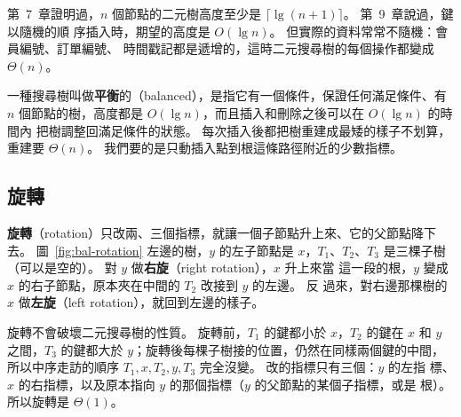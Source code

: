 第~7~章證明過，$n$ 個節點的二元樹高度至少是 $\lceil \lg(n+1) \rceil$。 第~9~章說過，鍵以隨機的順
序插入時，期望的高度是 $O(\lg n)$。 但實際的資料常常不隨機：會員編號、訂單編號、
時間戳記都是遞增的，這時二元搜尋樹的每個操作都變成 $\Theta(n)$。

一種搜尋樹叫做\textbf{平衡}的（balanced），是指它有一個條件，保證任何滿足條件、有
$n$ 個節點的樹，高度都是 $O(\lg n)$，而且插入和刪除之後可以在 $O(\lg n)$ 的時間內
把樹調整回滿足條件的狀態。 每次插入後都把樹重建成最矮的樣子不划算，重建要
$\Theta(n)$。 我們要的是只動插入點到根這條路徑附近的少數指標。

\subsection{旋轉}

\textbf{旋轉}（rotation）只改兩、三個指標，就讓一個子節點升上來、它的父節點降下
去。 圖~\ref{fig:bal-rotation} 左邊的樹，$y$ 的左子節點是 $x$，$T_1$、$T_2$、$T_3$
是三棵子樹（可以是空的）。 對 $y$ 做\textbf{右旋}（right rotation），$x$ 升上來當
這一段的根，$y$ 變成 $x$ 的右子節點，原本夾在中間的 $T_2$ 改接到 $y$ 的左邊。 反
過來，對右邊那棵樹的 $x$ 做\textbf{左旋}（left rotation），就回到左邊的樣子。

\begin{center}
\label{fig:bal-rotation}
\end{center}

旋轉不會破壞二元搜尋樹的性質。 旋轉前，$T_1$ 的鍵都小於 $x$，$T_2$ 的鍵在 $x$ 和
$y$ 之間，$T_3$ 的鍵都大於 $y$；旋轉後每棵子樹接的位置，仍然在同樣兩個鍵的中間，
所以中序走訪的順序 $T_1, x, T_2, y, T_3$ 完全沒變。 改的指標只有三個：$y$ 的左指
標、$x$ 的右指標，以及原本指向 $y$ 的那個指標（$y$ 的父節點的某個子指標，或是
根）。 所以旋轉是 $\Theta(1)$。

